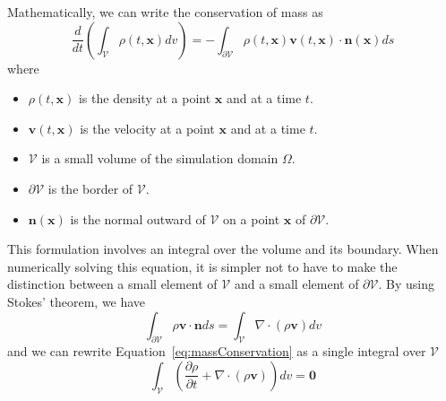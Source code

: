 Mathematically, we can write the conservation of mass as
\begin{equation}
    \label{eq:massConservation}
    \displaystyle 
    \frac{d}{dt}\left( \int_{\mathcal{V}} \rho(t,\mathbf{x}) dv \right)
    =
    - \int_{\mathcal{\partial V}}\rho(t,\mathbf{x})\mathbf{v}(t,\mathbf{x}) \cdot \mathbf{n}(\mathbf{x}) ds
\end{equation}
where
\begin{itemize}
	\item $\rho(t,\mathbf{x})$ is the density at a point $\mathbf{x}$ and at a time $t$.
	\item $\mathbf{v}(t,\mathbf{x})$ is the velocity at a point $\mathbf{x}$ and at a time $t$.
	\item $\mathcal{V}$ is a small volume of the simulation domain $\Omega$.
	\item $\mathcal{\partial V}$ is the border of $\mathcal{V}$.
	\item $\mathbf{n}(\mathbf{x})$ is the normal outward of $\mathcal{V}$ on a point $\mathbf{x}$ of $\partial\mathcal{V}$.
\end{itemize}
This formulation involves an integral over the volume and its boundary.
When numerically solving this equation, it is simpler not to have to make the distinction between a small element of $\mathcal{V}$ and a small element of $\partial \mathcal{V}$.
By using Stokes' theorem, we have
\begin{equation}
\displaystyle 
\int_{\partial \mathcal{V}} \rho \mathbf{v} \cdot \mathbf{n} ds =
\int_{\mathcal{V}} \nabla \cdot \left( \rho \mathbf{v} \right) dv
\end{equation}
and we can rewrite Equation~\eqref{eq:massConservation} as a single integral over $\mathcal{V}$
\begin{equation}
\label{eq:volumetricMassConservation}
\displaystyle 
\int_{\mathcal{V}} 
\left( \frac{\partial \rho}{\partial t} + \nabla \cdot \left( \rho  \mathbf{v} \right) \right) dv = \mathbf{0}
\end{equation}

